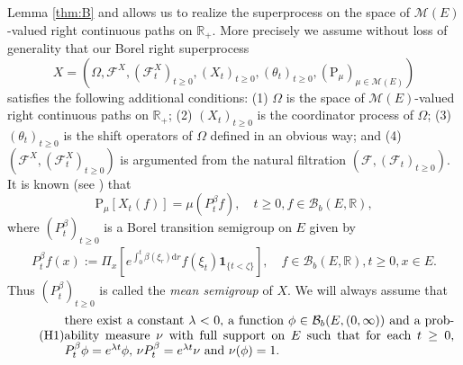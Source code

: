 \documentclass[12pt,a4paper]{amsart}
\numberwithin{equation}{section}
\theoremstyle{plain}
\theoremstyle{definition}
\theoremstyle{remark}
\begin{document}
	Lemma \ref{thm:B} and \cite[Lemma A.33]{Li2011Measure-valued} allows us to realize the superprocess on the space of $\mathcal M(E)$-valued right continuous paths on $\mathbb R_+$. 
	More precisely we assume without loss of generality that our Borel right superprocess \[X=(\Omega, \mathscr F^X, (\mathscr F^X_t)_{t\geq 0}, (X_t)_{t\geq 0}, (\theta_t)_{t\geq 0}, (\mathrm P_\mu)_{\mu\in \mathcal M(E)} )\] satisfies the following additional conditions: (1) $\Omega$ is the space of $\mathcal M(E)$-valued right continuous paths on $\mathbb R_+$; (2) $(X_t)_{t\geq 0}$ is the coordinator process of $\Omega$; (3) $(\theta_t)_{t\geq 0}$ is the shift operators of $\Omega$ defined in an obvious way; and (4) $(\mathscr F^X, (\mathscr F^X_t)_{t\geq 0})$ is argumented from the natural filtration $(\mathscr F, (\mathscr F_t)_{t\geq 0})$. 
	It is known (see \cite[Propositions 2.27, A.41]{Li2011Measure-valued}) that
\begin{equation} \label{eq:M.2}
	\mathrm P_\mu[X_t(f)] = \mu (P_t^\beta f),
	\quad t\geq 0, f \in \mathcal B_b(E,\mathbb R),
\end{equation}
	where $(P_t^\beta)_{t\geq 0}$ is a Borel transition semigroup on $E$ given by
\begin{align}\label{eq:M.15}
	P_t^\beta f(x)
	:= \Pi_x[e^{\int_0^t \beta(\xi_r) {\mathrm d}r }f(\xi_t) \mathbf 1_{\{t < \zeta\}}],
	\quad f\in \mathcal B_b(E,\mathbb R), t\geq 0, x\in E.
\end{align}
	Thus $(P_t^\beta)_{t\geq 0}$ is called the \emph{mean semigroup}  of $X$.
	We will always assume that
\begin{equation}\label{asp:H1} \tag{H1}
\begin{minipage}{0.9\textwidth}
	there exist a constant $\lambda < 0$, a function $\phi \in \mathcal B_b(E,(0,\infty))$ and a probability measure $\nu$ with full support on $E$ such that for each $t\geq 0$, $P_t^\beta \phi = e^{\lambda t} \phi$, $\nu P_t^\beta = e^{\lambda t} \nu$ and $\nu(\phi) =1$.
\end{minipage}
\end{equation}
\end{document}
